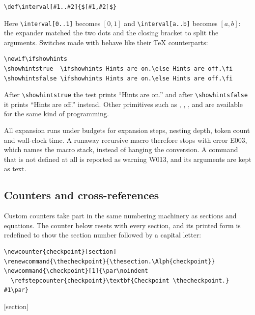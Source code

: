 \begin{verbatim}
\def\interval[#1..#2]{$[#1,#2]$}
\end{verbatim}
\def\interval[#1..#2]{$[#1,#2]$}

Here \verb|\interval[0..1]| becomes \interval[0..1] and \verb|\interval[a..b]| becomes
\interval[a..b]: the expander matched the two dots and the closing bracket to split the
arguments. Switches made with  behave like their \TeX{} counterparts:

\begin{verbatim}
\newif\ifshowhints
\showhintstrue  \ifshowhints Hints are on.\else Hints are off.\fi
\showhintsfalse \ifshowhints Hints are on.\else Hints are off.\fi
\end{verbatim}
\newif\ifshowhints

After \verb|\showhintstrue| the test prints
``\showhintstrue\ifshowhints Hints are on.\else Hints are off.\fi'' and after
\verb|\showhintsfalse| it prints
``\showhintsfalse\ifshowhints Hints are on.\else Hints are off.\fi'' instead. Other primitives
such as , , ,  and  are
available for the same kind of programming.

\begin{tip}
All expansion runs under budgets for expansion steps, nesting depth, token count and
wall-clock time. A runaway recursive macro therefore stops with error E003, which names
the macro stack, instead of hanging the conversion. A command that is not defined at all
is reported as warning W013, and its arguments are kept as text.
\end{tip}

\subsection{Counters and cross-references}

Custom counters take part in the same numbering machinery as sections and equations. The
counter below resets with every section, and its printed form is redefined to show
the section number followed by a capital letter:

\begin{verbatim}
\newcounter{checkpoint}[section]
\renewcommand{\thecheckpoint}{\thesection.\Alph{checkpoint}}
\newcommand{\checkpoint}[1]{\par\noindent
  \refstepcounter{checkpoint}\textbf{Checkpoint \thecheckpoint.} #1\par}
\end{verbatim}
[section]
\renewcommand{\thecheckpoint}{\thesection.\Alph{checkpoint}}
\newcommand{\checkpoint}[1]{\par\noindent
  \refstepcounter{checkpoint}\textbf{Checkpoint \thecheckpoint.} #1\par}

